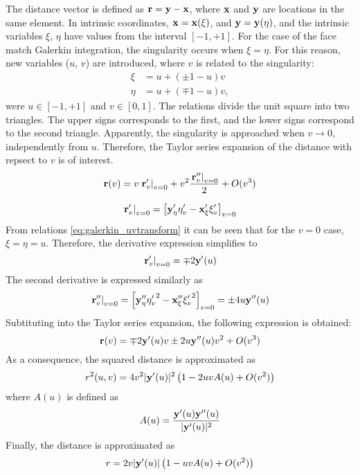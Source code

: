 The distance vector is defined as ${\bf r} = {\bf y} - {\bf x}$, where ${\bf x}$ and ${\bf y}$ are locations in the same element.
In intrinsic coordinates, ${\bf x} = {\bf x}(\xi)$, and ${\bf y} = {\bf y}(\eta)$, and the intrinsic variables $\xi$, $\eta$ have values from the interval $[-1, +1]$.
For the case of the face match Galerkin integration, the singularity occurs when $\xi = \eta$. 
For this reason, new variables ($u$, $v$) are introduced, where $v$ is related to the singularity:
%
\begin{align}
	\xi &= u + (\pm 1 - u) v \\
	\eta &= u + (\mp 1 - u) v,
\end{align}
%
were $u \in [-1, +1]$ and $v \in [0, 1]$.
The relations divide the unit square into two triangles. 
The upper signs corresponds to the first, and the lower signs correspond to the second triangle.
Apparently, the singularity is approached when $v \to 0$, independently from $u$.
Therefore, the Taylor series expansion of the distance with repsect to $v$ is of interest.
%
\begin{equation}
	{\bf r}(v) = v \left.{\bf r}'_v\right|_{v=0} + v^2 \frac{\left.{\bf r}''_v\right|_{v=0}}{2} + O(v^3)
\end{equation}

\begin{equation}
	\left.{\bf r}'_v\right|_{v=0} = \left[{\bf y}'_{\eta} \eta'_v - {\bf x}'_{\xi} \xi'_v\right]_{v=0}
\end{equation}
%
From relations \eqref{eq:galerkin_uvtransform} it can be seen that for the $v=0$ case, $\xi = \eta = u$.
Therefore, the derivative expression simplifies to
%
\begin{equation}
	\left.{\bf r}'_v\right|_{v=0} = \mp 2 {\bf y}'(u) 
\end{equation}
%
The second derivative is expressed similarly as
%
\begin{equation}
	\left.{\bf r}''_v\right|_{v=0}
	=
	\left[
		{\bf y}''_\eta {\eta'_v}^2 - {\bf x}''_{\xi} {\xi'_v}^2
	\right]_{v=0}
	= \pm 4u {\bf y}''(u)
\end{equation}
%
Subtituting into the Taylor series expansion, the following expression is obtained:
%
\begin{equation}
	{\bf r}(v) = \mp 2 {\bf y}'(u) v 
	\pm 2u {\bf y}''(u) v^2 
	+ O(v^3)
\end{equation}
%
As a consequence, the squared distance is approximated as
%
\begin{equation}
	r^2(u,v) = 
	4v^2 |{\bf y}'(u)|^2
	\left(
	1
	-
	2 u v A(u)
	+ O(v^2)
	\right)
\end{equation}
%
where $A(u)$ is defined as
%
\begin{equation}
	A(u) = \frac{{\bf y}'(u) {\bf y}''(u)}{|{\bf y}'(u)|^2}
\end{equation}
%
Finally, the distance is approximated as
%
\begin{equation}
	r = 2v|{\bf y}'(u)| \left(1 - u v A(u) + O(v^2) \right)
	\label{eq:galerkin_face_taylor_r}
\end{equation}

